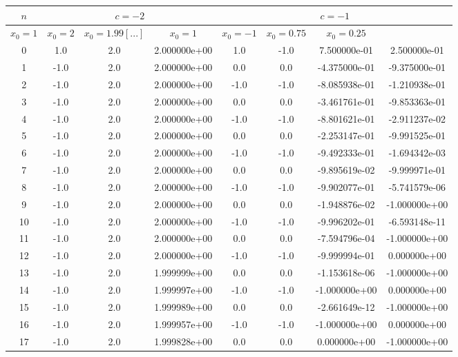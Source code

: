 \documentclass[12pt]{article}
\begin{document}
\newpage
\begin{table}[!h]
\centering
\footnotesize
    \label{tab:table8}
    \begin{tabular}{|c|c|c|c|c|c|c|c|}
    		\hline
    		$n$ & \multicolumn{3}{|c|}{$c=-2$} & \multicolumn{4}{|c|}{$c=-1$}\\
    		\hline
    		$x_0=1$ & $x_0=2$ & $x_0=1.99[...]$ & $x_0=1$ & $x_0=-1$ & $x_0=0.75$ & $x_0=0.25$\\
    		\hline
0 & 1.0 & 2.0 & 2.000000e+00 & 1.0 & -1.0 & 7.500000e-01 & 2.500000e-01\\
\hline
1 & -1.0 & 2.0 & 2.000000e+00 & 0.0 & 0.0 & -4.375000e-01 & -9.375000e-01\\
\hline
2 & -1.0 & 2.0 & 2.000000e+00 & -1.0 & -1.0 & -8.085938e-01 & -1.210938e-01\\
\hline
3 & -1.0 & 2.0 & 2.000000e+00 & 0.0 & 0.0 & -3.461761e-01 & -9.853363e-01\\
\hline
4 & -1.0 & 2.0 & 2.000000e+00 & -1.0 & -1.0 & -8.801621e-01 & -2.911237e-02\\
\hline
5 & -1.0 & 2.0 & 2.000000e+00 & 0.0 & 0.0 & -2.253147e-01 & -9.991525e-01\\
\hline
6 & -1.0 & 2.0 & 2.000000e+00 & -1.0 & -1.0 & -9.492333e-01 & -1.694342e-03\\
\hline
7 & -1.0 & 2.0 & 2.000000e+00 & 0.0 & 0.0 & -9.895619e-02 & -9.999971e-01\\
\hline
8 & -1.0 & 2.0 & 2.000000e+00 & -1.0 & -1.0 & -9.902077e-01 & -5.741579e-06\\
\hline
9 & -1.0 & 2.0 & 2.000000e+00 & 0.0 & 0.0 & -1.948876e-02 & -1.000000e+00\\
\hline
10 & -1.0 & 2.0 & 2.000000e+00 & -1.0 & -1.0 & -9.996202e-01 & -6.593148e-11\\
\hline
11 & -1.0 & 2.0 & 2.000000e+00 & 0.0 & 0.0 & -7.594796e-04 & -1.000000e+00\\
\hline
12 & -1.0 & 2.0 & 2.000000e+00 & -1.0 & -1.0 & -9.999994e-01 & 0.000000e+00\\
\hline
13 & -1.0 & 2.0 & 1.999999e+00 & 0.0 & 0.0 & -1.153618e-06 & -1.000000e+00\\
\hline
14 & -1.0 & 2.0 & 1.999997e+00 & -1.0 & -1.0 & -1.000000e+00 & 0.000000e+00\\
\hline
15 & -1.0 & 2.0 & 1.999989e+00 & 0.0 & 0.0 & -2.661649e-12 & -1.000000e+00\\
\hline
16 & -1.0 & 2.0 & 1.999957e+00 & -1.0 & -1.0 & -1.000000e+00 & 0.000000e+00\\
\hline
17 & -1.0 & 2.0 & 1.999828e+00 & 0.0 & 0.0 & 0.000000e+00 & -1.000000e+00\\

\end{tabular}
\end{table}
\end{document}
